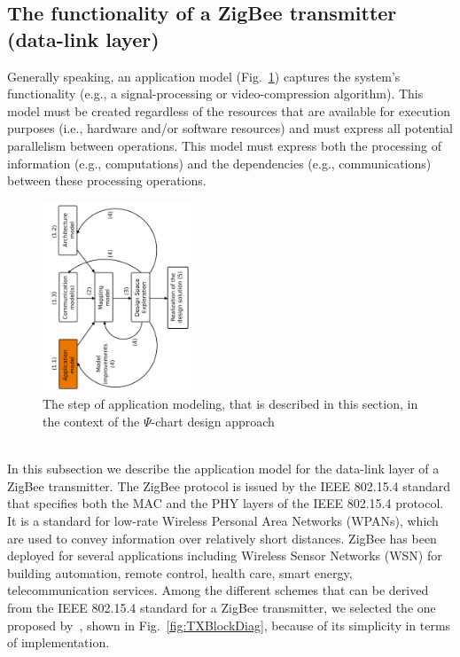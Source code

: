 \documentclass{llncs}
\begin{document}
\subsection{The functionality of a ZigBee transmitter (data-link layer)}
%
Generally speaking, an application model (Fig.~\ref{fig:PsiChartApp}) captures the system's functionality (e.g., a
signal-processing or video-compression algorithm). This model must be created regardless of the resources that are
available for execution purposes (i.e., hardware and/or software resources) and must express all potential parallelism
between operations. This model must express both the processing of information (e.g., computations) and the dependencies
(e.g., communications) between these processing operations.
%
\begin{figure}[htbp]
	\centering
	\includegraphics[angle=-90,origin=c,width=0.4\textwidth]{figures/PsiChartApp.pdf}
	\caption{The step of application modeling, that is described in this section, in the context of the $\Psi$-chart
    design approach}
	\label{fig:PsiChartApp}
\end{figure}
%
\\In this subsection we describe the application model for the data-link layer of a ZigBee transmitter. The ZigBee
protocol is issued by the IEEE 802.15.4 standard that specifies both the MAC and the PHY layers of the IEEE 802.15.4
protocol. It is a standard for low-rate Wireless Personal Area Networks (WPANs), which are used to convey information
over relatively short distances. ZigBee has been deployed for several applications including Wireless Sensor Networks
(WSN) for building automation, remote control, health care, smart energy, telecommunication services. Among the
different schemes that can be derived from the IEEE 802.15.4 standard for a ZigBee transmitter, we selected the one
proposed by~\cite{Koteng06}, shown in Fig.~\ref{fig:TXBlockDiag}, because of its simplicity in terms of implementation.
\end{document}
